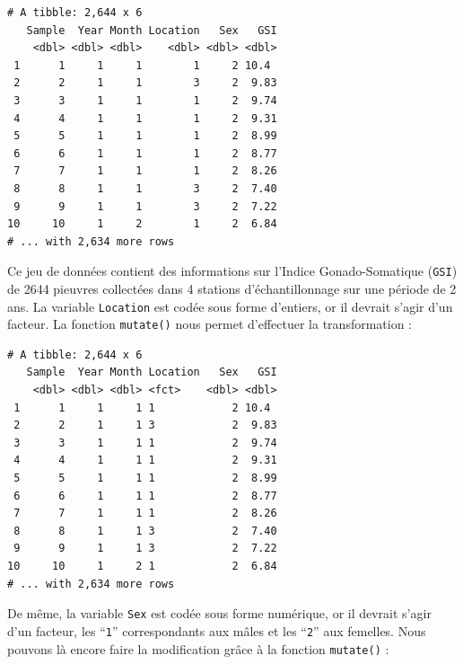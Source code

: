 \documentclass[a4paperpaper,]{article}
\newenvironment{Shaded}{\begin{snugshade}}{\end{snugshade}}
\newcommand{\DataTypeTok}[1]{\textcolor[rgb]{0.00,0.34,0.68}{#1}}
\newcommand{\DecValTok}[1]{\textcolor[rgb]{0.69,0.50,0.00}{#1}}
\newcommand{\KeywordTok}[1]{\textcolor[rgb]{0.12,0.11,0.11}{\textbf{#1}}}
\newcommand{\NormalTok}[1]{\textcolor[rgb]{0.12,0.11,0.11}{#1}}
\newcommand{\OperatorTok}[1]{\textcolor[rgb]{0.12,0.11,0.11}{#1}}
\newcommand{\StringTok}[1]{\textcolor[rgb]{0.75,0.01,0.01}{#1}}
\begin{document}
\begin{verbatim}
# A tibble: 2,644 x 6
   Sample  Year Month Location   Sex   GSI
    <dbl> <dbl> <dbl>    <dbl> <dbl> <dbl>
 1      1     1     1        1     2 10.4 
 2      2     1     1        3     2  9.83
 3      3     1     1        1     2  9.74
 4      4     1     1        1     2  9.31
 5      5     1     1        1     2  8.99
 6      6     1     1        1     2  8.77
 7      7     1     1        1     2  8.26
 8      8     1     1        3     2  7.40
 9      9     1     1        3     2  7.22
10     10     1     2        1     2  6.84
# ... with 2,634 more rows
\end{verbatim}

Ce jeu de données contient des informations sur l'Indice Gonado-Somatique (\texttt{GSI}) de 2644 pieuvres collectées dans 4 stations d'échantillonnage sur une période de 2 ans. La variable \texttt{Location} est codée sous forme d'entiers, or il devrait s'agir d'un facteur. La fonction \texttt{mutate()} nous permet d'effectuer la transformation :

\begin{Shaded}
\end{Shaded}

\begin{verbatim}
# A tibble: 2,644 x 6
   Sample  Year Month Location   Sex   GSI
    <dbl> <dbl> <dbl> <fct>    <dbl> <dbl>
 1      1     1     1 1            2 10.4 
 2      2     1     1 3            2  9.83
 3      3     1     1 1            2  9.74
 4      4     1     1 1            2  9.31
 5      5     1     1 1            2  8.99
 6      6     1     1 1            2  8.77
 7      7     1     1 1            2  8.26
 8      8     1     1 3            2  7.40
 9      9     1     1 3            2  7.22
10     10     1     2 1            2  6.84
# ... with 2,634 more rows
\end{verbatim}

De même, la variable \texttt{Sex} est codée sous forme numérique, or il devrait s'agir d'un facteur, les ``\texttt{1}'' correspondants aux mâles et les ``\texttt{2}'' aux femelles. Nous pouvons là encore faire la modification grâce à la fonction \texttt{mutate()} :

\begin{Shaded}
\end{Shaded}
\end{document}
